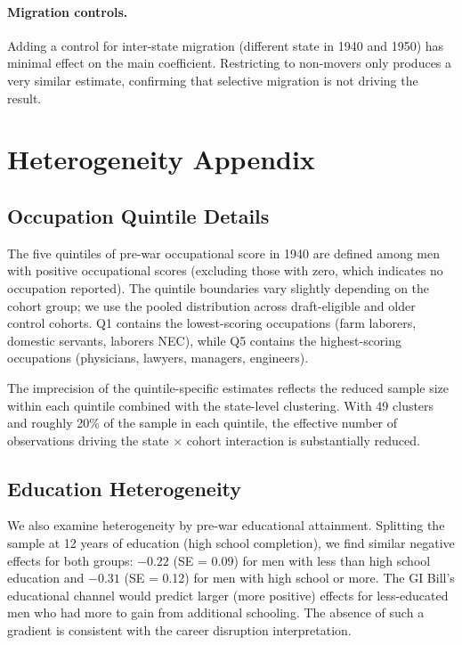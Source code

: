 \documentclass[12pt]{article}
\begin{document}
\paragraph{Migration controls.} Adding a control for inter-state migration (different state in 1940 and 1950) has minimal effect on the main coefficient. Restricting to non-movers only produces a very similar estimate, confirming that selective migration is not driving the result.

\section{Heterogeneity Appendix}

\subsection{Occupation Quintile Details}

The five quintiles of pre-war occupational score in 1940 are defined among men with positive occupational scores (excluding those with zero, which indicates no occupation reported). The quintile boundaries vary slightly depending on the cohort group; we use the pooled distribution across draft-eligible and older control cohorts. Q1 contains the lowest-scoring occupations (farm laborers, domestic servants, laborers NEC), while Q5 contains the highest-scoring occupations (physicians, lawyers, managers, engineers).

The imprecision of the quintile-specific estimates reflects the reduced sample size within each quintile combined with the state-level clustering. With 49 clusters and roughly 20\% of the sample in each quintile, the effective number of observations driving the state $\times$ cohort interaction is substantially reduced.

\subsection{Education Heterogeneity}

We also examine heterogeneity by pre-war educational attainment. Splitting the sample at 12 years of education (high school completion), we find similar negative effects for both groups: $-0.22$ (SE = 0.09) for men with less than high school education and $-0.31$ (SE = 0.12) for men with high school or more. The GI Bill's educational channel would predict larger (more positive) effects for less-educated men who had more to gain from additional schooling. The absence of such a gradient is consistent with the career disruption interpretation.
\end{document}
